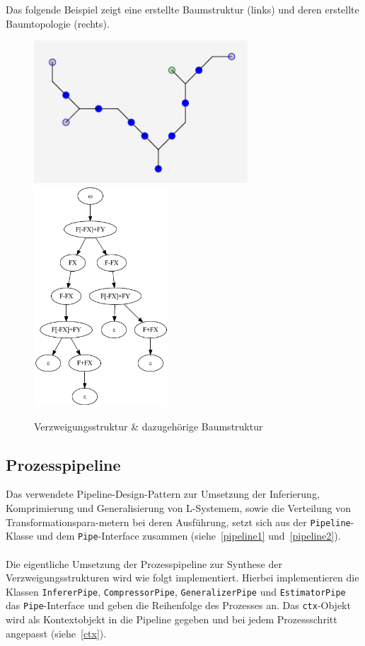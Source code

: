 Das folgende Beispiel zeigt eine erstellte Baumstruktur (links) und deren erstellte Baumtopologie (rechts).
\begin{figure}[H]
    \centering
    \includegraphics[width=8cm]{../images/graph_tree.png}
    \includegraphics[width=5cm]{../images/tree_graph.png}
    \caption{Verzweigungsstruktur \& dazugehörige Baumstruktur}
\end{figure}

\subsection*{Prozesspipeline}
Das verwendete Pipeline-Design-Pattern zur Umsetzung der Inferierung, Komprimierung und Generalisierung von L-Systemem,
sowie die Verteilung von Transformationspara-metern bei deren Ausführung, setzt sich aus der \texttt{Pipeline}-Klasse und
dem \texttt{Pipe}-Interface zusammen (siehe~\ref{pipeline1} und~\ref{pipeline2}).\\~\\
Die eigentliche Umsetzung der Prozesspipeline zur Synthese der Verzweigungsstrukturen wird wie folgt implementiert.
Hierbei implementieren die Klassen \texttt{InfererPipe}, \texttt{CompressorPipe}, \texttt{GeneralizerPipe} und
\texttt{EstimatorPipe} das \texttt{Pipe}-Interface und geben die Reihenfolge des Prozesses an.
Das \texttt{ctx}-Objekt wird als Kontextobjekt in die Pipeline gegeben und bei jedem Prozessschritt angepasst (siehe~\ref{ctx}).

